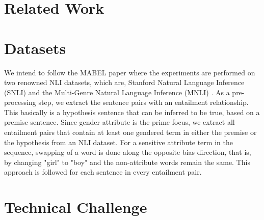 \documentclass[11pt]{article}
\begin{document}
\section{Related Work}

\section{Datasets}

We intend to follow the MABEL paper where the experiments are performed on two renowned NLI datasets, which are, Stanford Natural Language Inference (SNLI) \cite{SNLI_dataset_paper} and the Multi-Genre Natural Language Inference (MNLI) \cite{MNLI_dataset_paper}.
As a pre-processing step, we extract the sentence pairs with an entailment relationship. This basically is a hypothesis sentence that can be inferred to be true, based on a premise sentence. Since gender attribute is the prime focus, we extract all entailment pairs that contain at least one gendered term in either the premise or the hypothesis from an NLI dataset. For a sensitive attribute term in the sequence, swapping of a word is done along the opposite bias direction, that is, by changing "girl" to "boy" and the non-attribute words remain the same. This approach is followed for each sentence in every entailment pair.

\section{Technical Challenge}






\appendix
\end{document}

